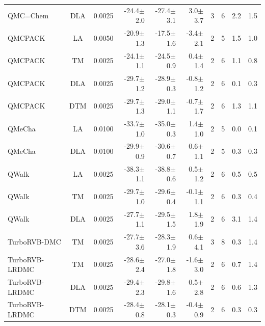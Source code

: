 \begin{tabular}{|lc|lr|r|r|cccc|}
QMC=Chem         &  DLA  & 0.0025 & -24.4$\pm$2.0 & -27.4$\pm$3.1 & 3.0$\pm$3.7 & 3 & 6 & 2.2 & 1.5 \\
QMCPACK          &  LA   & 0.0050 & -20.9$\pm$1.3 & -17.5$\pm$1.6 & -3.4$\pm$2.1 & 2 & 5 & 1.5 & 1.0 \\
QMCPACK          &  TM   & 0.0025 & -24.1$\pm$1.1 & -24.5$\pm$0.9 & 0.4$\pm$1.4 & 2 & 6 & 1.1 & 0.8 \\
QMCPACK          &  DLA  & 0.0025 & -29.7$\pm$1.2 & -28.9$\pm$0.3 & -0.8$\pm$1.2 & 2 & 6 & 0.1 & 0.3 \\
QMCPACK          &  DTM  & 0.0025 & -29.7$\pm$1.3 & -29.0$\pm$1.1 & -0.7$\pm$1.7 & 2 & 6 & 1.3 & 1.1 \\
QMeCha           &  LA   & 0.0100 & -33.7$\pm$1.0 & -35.0$\pm$0.3 & 1.4$\pm$1.0 & 2 & 5 & 0.0 & 0.1 \\
QMeCha           &  DLA  & 0.0100 & -29.9$\pm$0.9 & -30.6$\pm$0.7 & 0.6$\pm$1.1 & 2 & 5 & 0.3 & 0.3 \\
QWalk            &  LA   & 0.0025 & -38.3$\pm$1.1 & -38.8$\pm$0.6 & 0.5$\pm$1.2 & 2 & 6 & 0.5 & 0.5 \\
QWalk            &  TM   & 0.0025 & -29.7$\pm$1.0 & -29.6$\pm$0.4 & -0.1$\pm$1.1 & 2 & 6 & 0.3 & 0.4 \\
QWalk            &  DLA  & 0.0025 & -27.7$\pm$1.1 & -29.5$\pm$1.5 & 1.8$\pm$1.9 & 2 & 6 & 3.1 & 1.4 \\
TurboRVB-DMC     &  TM   & 0.0025 & -27.7$\pm$3.6 & -28.3$\pm$1.9 & 0.6$\pm$4.1 & 3 & 8 & 0.3 & 1.4 \\
TurboRVB-LRDMC   &  TM   & 0.0025 & -28.6$\pm$2.4 & -27.0$\pm$1.8 & -1.6$\pm$3.0 & 2 & 6 & 0.7 & 1.4 \\
TurboRVB-LRDMC   &  DLA  & 0.0025 & -29.4$\pm$2.3 & -29.8$\pm$1.6 & 0.5$\pm$2.8 & 2 & 6 & 0.6 & 1.3 \\
TurboRVB-LRDMC   &  DTM  & 0.0025 & -28.4$\pm$0.8 & -28.1$\pm$0.3 & -0.4$\pm$0.9 & 2 & 6 & 0.3 & 0.3 \\
\bottomrule
\end{tabular}
